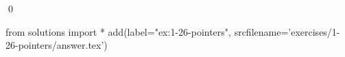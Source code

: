 
\begin{ex}
  \label{ex:1-26-pointers}
  
  \qed
\end{ex}
\begin{python0}
from solutions import *
add(label="ex:1-26-pointers",
    srcfilename='exercises/1-26-pointers/answer.tex')
\end{python0}
